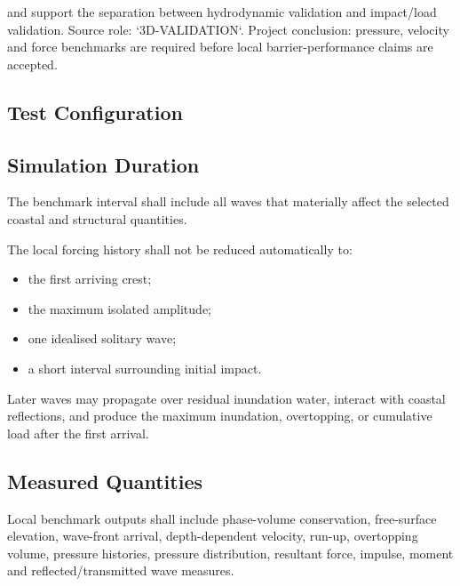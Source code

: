 \textcite{watanabe2022validation} and \textcite{qin2018comparison}
support the separation between hydrodynamic validation and impact/load
validation. Source role: `3D-VALIDATION`. Project conclusion:
pressure, velocity and force benchmarks are required before local
barrier-performance claims are accepted.

\subsection{Test Configuration}
\label{sec:res-ver-bmk-test-configuration}


\subsection{Simulation Duration}
\label{sec:res-ver-bmk-simulation}

The benchmark interval shall include all waves that materially affect
the selected coastal and structural quantities.

The local forcing history shall not be reduced automatically to:

\begin{itemize}
  \item the first arriving crest;
  \item the maximum isolated amplitude;
  \item one idealised solitary wave;
  \item a short interval surrounding initial impact.
\end{itemize}

Later waves may propagate over residual inundation water, interact with
coastal reflections, and produce the maximum inundation, overtopping,
or cumulative load after the first arrival.

\subsection{Measured Quantities}
\label{sec:res-ver-bmk-measured-quantities}


Local benchmark outputs shall include phase-volume conservation,
free-surface elevation, wave-front arrival, depth-dependent velocity,
run-up, overtopping volume, pressure histories, pressure distribution,
resultant force, impulse, moment and reflected/transmitted wave
measures.

